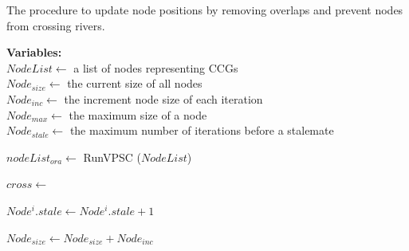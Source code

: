\begin{algorithm}[tb!]
    \caption{The procedure to update node positions by removing overlaps and prevent nodes from crossing rivers.}\label{alg:UpdateNodePosition}
    \textbf{Variables:} \\
    $NodeList \gets$ a list of nodes representing CCGs \\
    $Node_{size}\gets$ the current size of all nodes \\
    $Node_{inc} \gets$ the increment node size of each iteration \\
    $Node_{max} \gets$ the maximum size of a node \\
    $Node_{stale} \gets$ the maximum number of iterations before a stalemate \\
    \begin{algorithmic}[1]

        \State $ nodeList_{ora} \gets $ RunVPSC ($ NodeList $)


                    \State $ cross \gets $ 

                        \State $ Node^i.stale \gets Node^i.stale + 1 $

                            \State {}
                        \Else
                            \State {}
                        \EndIf

                    \EndIf

                \EndIf

            \EndFor

        \EndWhile

        \State $Node_{size} \gets Node_{size} + Node_{inc}$

        \EndProcedure
    \end{algorithmic}
\end{algorithm}


